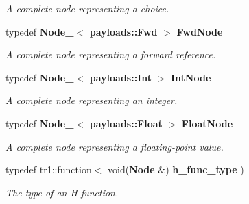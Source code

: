 \begin{CompactItemize}
\begin{CompactList}\small\item\em A complete node representing a choice. \item\end{CompactList}\item 
typedef {\bf Node\_\-}$<$ {\bf payloads::Fwd} $>$ {\bf Fwd\-Node}
\begin{CompactList}\small\item\em A complete node representing a forward reference. \item\end{CompactList}\item 
typedef {\bf Node\_\-}$<$ {\bf payloads::Int} $>$ {\bf Int\-Node}\label{namespacesprite_a33}

\begin{CompactList}\small\item\em A complete node representing an integer. \item\end{CompactList}\item 
typedef {\bf Node\_\-}$<$ {\bf payloads::Float} $>$ {\bf Float\-Node}\label{namespacesprite_a34}

\begin{CompactList}\small\item\em A complete node representing a floating-point value. \item\end{CompactList}\item 
typedef tr1::function$<$ void({\bf Node} \&) {\bf h\_\-func\_\-type} )\label{namespacesprite_a43}

\begin{CompactList}\small\item\em The type of an H function. \item\end{CompactList}\end{CompactItemize}
